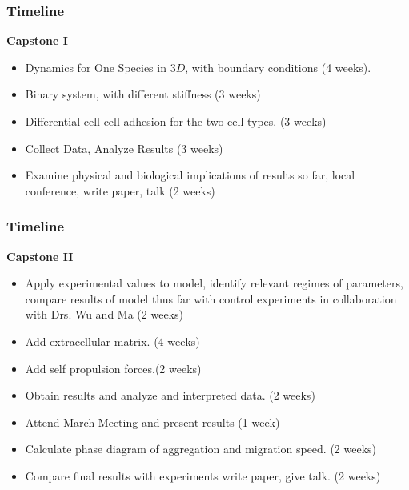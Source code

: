 \documentclass{beamer}
\begin{document}
  \begin{frame}
    \frametitle{Timeline}
    
      {\bf Capstone I}
      \begin{itemize}\itemsep1pt \parskip0pt 
		\item Dynamics for One Species in $3D$, with boundary conditions (4 weeks).
		\item Binary system, with different stiffness (3 weeks)
		\item Differential cell-cell adhesion for the two cell types. (3 weeks) 
		\item Collect Data, Analyze Results (3 weeks)
		\item Examine physical and biological implications of results so far,
local conference, write paper, talk (2 weeks)\\

	  \end{itemize}
	  
  \end{frame}
  
  \begin{frame}
    \frametitle{Timeline}
  	
  	{\bf Capstone II}
	  \begin{itemize}\itemsep1pt \parskip0pt
	  	\item Apply experimental values to model, identify relevant regimes of parameters, compare results of model thus far with control experiments in collaboration with Drs. Wu and Ma (2 weeks) 
		\item Add extracellular matrix. (4 weeks)
		\item Add self propulsion forces.(2 weeks)
		\item Obtain results and analyze and interpreted  data. (2 weeks)
		\item Attend March Meeting and present results (1 week)
		\item Calculate phase diagram of aggregation and migration speed. (2 weeks)
		\item Compare final results with experiments write paper, give talk. (2 weeks)
		
	  \end{itemize}
    
    \vfill
    
  \end{frame}
  
\end{document}
